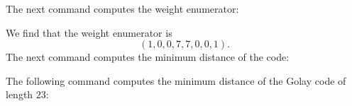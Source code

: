 
The next command computes the weight enumerator:


We find that the weight enumerator is
$$
( 1, 0, 0, 7, 7, 0, 0, 1 ).
$$
The next command computes the minimum distance of the code:


The following command computes the minimum distance 
of the Golay code of length $23$:




\bigskip

